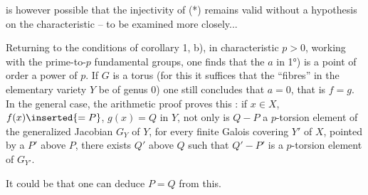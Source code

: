 is however possible that the injectivity of (*) remains valid without a hypothesis on the characteristic -- to be examined more closely...

Returning to the conditions of corollary 1, b), in characteristic $p>0$, working with the prime-to-$p$ fundamental groups, one finds that the $a$ in 1°) is a point  of order a power of $p$. If $G$ is a torus (for this it suffices that the ``fibres'' in the elementary variety $Y$ be of genus 0) one still concludes that $a=0$, that is $f=g$. In the general case, the arithmetic proof proves  this : if $x\in X$,   $f(x)\inserted{=P}$, $g(x)=Q$ in $Y$, not only is $Q-P$ a $p$-torsion element of the generalized Jacobian $G_Y$ of $Y$, for every finite Galois  covering $Y'$ of $X$,  pointed by a $P'$ above $P$, there exists $Q'$ above $Q$ such that $Q'-P'$ is a  $p$-torsion element of $G_{Y'}$.

It could be that one can deduce $P=Q$ from this.

